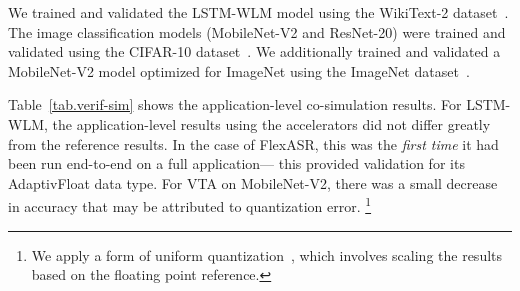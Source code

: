 We trained and validated the LSTM-WLM model using the WikiText-2 dataset~\cite{merity2016pointer}.
%
The image classification models (MobileNet-V2 and ResNet-20) were trained and validated using the CIFAR-10 dataset~\cite{cifar10}.
We additionally trained and validated a MobileNet-V2 model optimized for ImageNet using the ImageNet dataset~\cite{deng2009imagenet}.

Table~\ref{tab.verif-sim} shows the application-level co-simulation results.
%
%
%
%
%
%
For LSTM-WLM,
  the application-level results using the accelerators
  did not differ greatly
  from the reference results.
In the case of FlexASR,
  this was the \textit{first time}
  it had been run end-to-end on a full application---%
  this provided validation for its AdaptivFloat data type.
For VTA on MobileNet-V2,
  there was a small decrease in accuracy
  that may be attributed
  to quantization error.%
\footnote{We apply a form of uniform quantization~\cite{jacob2017quantization},
  which involves scaling the results
  based on the floating point reference.}

